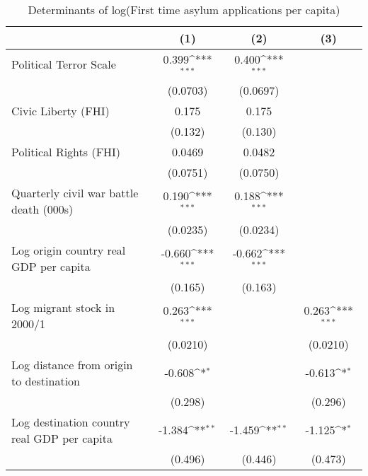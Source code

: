 \begin{table}[htbp]\centering
\def\sym#1{\ifmmode^{#1}\else\(^{#1}\)\fi}
\caption{Determinants of log(First time asylum applications per capita)}
\begin{tabular}{l*{3}{c}}
\hline\hline
                    &\multicolumn{1}{c}{(1)}         &\multicolumn{1}{c}{(2)}         &\multicolumn{1}{c}{(3)}         \\
\hline
Political Terror Scale&       0.399\sym{***}&       0.400\sym{***}&                     \\
                    &    (0.0703)         &    (0.0697)         &                     \\
[1em]
Civic Liberty (FHI) &       0.175         &       0.175         &                     \\
                    &     (0.132)         &     (0.130)         &                     \\
[1em]
Political Rights (FHI)&      0.0469         &      0.0482         &                     \\
                    &    (0.0751)         &    (0.0750)         &                     \\
[1em]
Quarterly civil war battle death (000s)&       0.190\sym{***}&       0.188\sym{***}&                     \\
                    &    (0.0235)         &    (0.0234)         &                     \\
[1em]
Log origin country real GDP per capita&      -0.660\sym{***}&      -0.662\sym{***}&                     \\
                    &     (0.165)         &     (0.163)         &                     \\
[1em]
Log migrant stock in 2000/1&       0.263\sym{***}&                     &       0.263\sym{***}\\
                    &    (0.0210)         &                     &    (0.0210)         \\
[1em]
Log distance from origin to destination&      -0.608\sym{*}  &                     &      -0.613\sym{*}  \\
                    &     (0.298)         &                     &     (0.296)         \\
[1em]
Log destination country real GDP per capita&      -1.384\sym{**} &      -1.459\sym{**} &      -1.125\sym{*}  \\
                    &     (0.496)         &     (0.446)         &     (0.473)         \\

\end{tabular}
\end{table}
